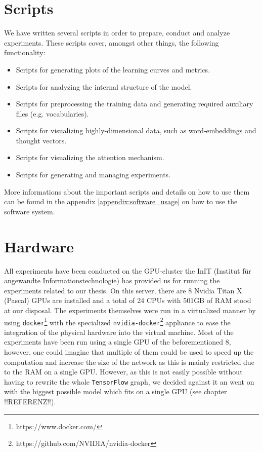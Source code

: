 \section{Scripts}
We have written several scripts in order to prepare, conduct and analyze experiments. These scripts cover, amongst other things, the following functionality:

\begin{itemize}[noitemsep]
	\item Scripts for generating plots of the learning curves and metrics.
	\item Scripts for analyzing the internal structure of the model.
	\item Scripts for preprocessing the training data and generating required auxiliary files (e.g. vocabularies).
	\item Scripts for visualizing highly-dimensional data, such as word-embeddings and thought vectors.
	\item Scripts for visualizing the attention mechanism.
	\item Scripts for generating and managing experiments.
\end{itemize}

More informations about the important scripts and details on how to use them can be found in the appendix \ref{appendix:software_usage} on how to use the software system.

\section{Hardware}
\label{software_system:hardware}
All experiments have been conducted on the GPU-cluster the InIT (Institut für angewandte Informationstechnologie) has provided us for running the experiments related to our thesis. On this server, there are 8 Nvidia Titan X (Pascal) GPUs are installed and a total of 24 CPUs with 501GB of RAM stood at our disposal. The experiments themselves were run in a virtualized manner by using \texttt{docker}\footnote{https://www.docker.com/} with the specialized \texttt{nvidia-docker}\footnote{https://github.com/NVIDIA/nvidia-docker} appliance to ease the integration of the physical hardware into the virtual machine. Most of the experiments have been run using a single GPU of the beforementioned 8, however, one could imagine that multiple of them could be used to speed up the computation and increase the size of the network as this is mainly restricted due to the RAM on a single GPU. However, as this is not easily possible without having to rewrite the whole \texttt{TensorFlow} graph, we decided against it an went on with the biggest possible model which fits on a single GPU (see chapter !!REFERENZ!!).

